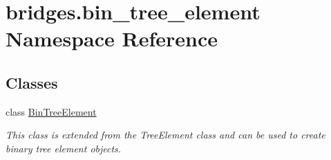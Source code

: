 \hypertarget{namespacebridges_1_1bin__tree__element}{}\section{bridges.\+bin\+\_\+tree\+\_\+element Namespace Reference}
\label{namespacebridges_1_1bin__tree__element}
\subsection*{Classes}
\begin{DoxyCompactItemize}
\item 
class \mbox{\hyperlink{classbridges_1_1bin__tree__element_1_1_bin_tree_element}{Bin\+Tree\+Element}}
\begin{DoxyCompactList}\small\item\em This class is extended from the Tree\+Element class and can be used to create binary tree element objects. \end{DoxyCompactList}\end{DoxyCompactItemize}
